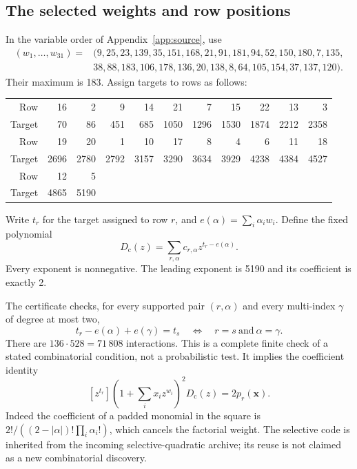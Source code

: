 \documentclass[11pt]{article}
\newcommand{\Dc}{D_{\mathrm c}}
\theoremstyle{remark}\newtheorem{remark}[theorem]{Remark}
\begin{document}
\subsection{The selected weights and row positions}

In the variable order of Appendix~\ref{app:source}, use
\begin{align*}
 (w_1,\ldots,w_{31})={}&(9,25,23,139,35,151,168,21,91,181,94,52,150,180,7,135,\\
 &38,88,183,106,178,136,20,138,8,64,105,154,37,137,120).
\end{align*}
Their maximum is 183. Assign targets to rows as follows:
\begin{center}\small
\begin{tabular}{@{}rrrrrrrrrrr@{}}
\toprule
Row &16&2&9&14&21&7&15&22&13&3\\
Target &70&86&451&685&1050&1296&1530&1874&2212&2358\\
\midrule
Row &19&20&1&10&17&8&4&6&11&18\\
Target &2696&2780&2792&3157&3290&3634&3929&4238&4384&4527\\
\midrule
Row &12&5&&&&&&&&\\
Target &4865&5190&&&&&&&&\\
\bottomrule
\end{tabular}
\end{center}
Write $t_r$ for the target assigned to row $r$, and
$e(\alpha)=\sum_i\alpha_iw_i$. Define the fixed polynomial
\begin{equation}\label{eq:fixedD}
 \Dc(z)=\sum_{r,\alpha}c_{r,\alpha}z^{t_r-e(\alpha)}.
\end{equation}
Every exponent is nonnegative. The leading exponent is 5190 and its
coefficient is exactly 2.

The certificate checks, for every supported pair $(r,\alpha)$ and every
multi-index $\gamma$ of degree at most two,
\begin{equation}\label{eq:isolation}
 t_r-e(\alpha)+e(\gamma)=t_s
 \quad\Longleftrightarrow\quad r=s\ \text{and}\ \alpha=\gamma.
\end{equation}
There are $136\cdot528=71\,808$ interactions. This is a complete finite
check of a stated combinatorial condition, not a probabilistic test.
It implies the coefficient identity
\begin{equation}\label{eq:extract}
 [z^{t_r}]\left(1+\sum_i x_i z^{w_i}\right)^2\Dc(z)
       =2p_r(\mathbf x).
\end{equation}
Indeed the coefficient of a padded monomial in the square is
$2!/((2-|\alpha|)!\prod_i\alpha_i!)$, which cancels the factorial weight.
The selective code is inherited from the incoming selective-quadratic
archive; its reuse is not claimed as a new combinatorial discovery.
\end{document}
